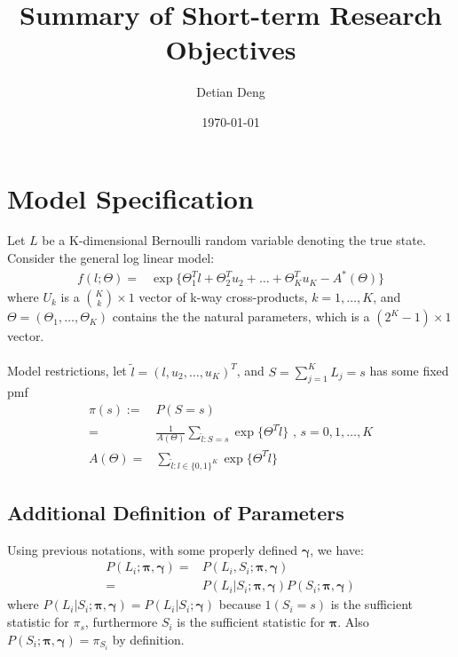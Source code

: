 \documentclass[11 pt, a4paper]{article}  %
\begin{document}
\title{Summary of Short-term Research Objectives}   %
\author{Detian Deng}         %
\date{\today}    %
\maketitle


\section{Model Specification}             %
Let $L$ be a K-dimensional Bernoulli random variable denoting the true state.
Consider the general log linear model:
\begin{align*}
f(l; \Theta) = & \exp \{\Theta_1^T l + \Theta_2^{T} u_2 + \ldots + \Theta_K^T u_K - A^*(\Theta)\}
\end{align*}
where $U_k$ is a ${K \choose k} \times 1$ vector of k-way cross-products, $k = 1,\ldots,K$,  and $\Theta = (\Theta_1,\ldots, \Theta_K)$ contains the the natural parameters, which is a $(2^K-1) \times 1$ vector.\\
\ \\
Model restrictions, let $\tilde{l} = (l,u_2,\dots,u_K)^T$, and $S = \sum_{j=1}^K L_j = s$ has some fixed pmf 
\begin{align}
\pi(s) := & P(S=s)\nonumber \\ 
= & \frac{1}{A(\Theta)} \sum_{\tilde{l}:S=s}\exp \{ \Theta^T \tilde{l}\}  \text{ , } s = 0,1,\ldots, K \\
A(\Theta) = & \sum_{\tilde{l}:l\in \{0,1\}^K}\exp \{ \Theta^T \tilde{l}\}
\end{align}

\newpage


\subsection{Additional Definition of Parameters}
Using previous notations,  with some properly defined $\boldsymbol\gamma$, we have:
\begin{align*}
P(L_i;\boldsymbol\pi, \boldsymbol\gamma) = & P(L_i,S_i;\boldsymbol\pi, \boldsymbol\gamma) \\
= & P(L_i|S_i;\boldsymbol\pi, \boldsymbol\gamma) P(S_i;\boldsymbol\pi, \boldsymbol\gamma)
\end{align*}
where $P(L_i|S_i;\boldsymbol\pi, \boldsymbol\gamma) = P(L_i|S_i;\boldsymbol\gamma)$ because $1(S_i=s)$ is the sufficient statistic for $\pi_s$, furthermore $S_i$ is the sufficient statistic for $\boldsymbol \pi$. Also $P(S_i;\boldsymbol\pi, \boldsymbol\gamma) = \pi_{S_i}$ by definition. \\
\end{document}
